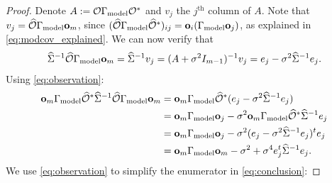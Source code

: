 \documentclass[ba]{imsart}
\newcommand{\obs}{\mathcal{O}}
\newcommand{\obsm}{\widehat{\obs}}
\newcommand{\Sigmam}{\widehat{\Sigma}}
\newcommand{\meas}{\mathbf{o}}
\theoremstyle{plain}
\theoremstyle{definition}
\theoremstyle{remark}
\providecommand{\DIFaddbegin}{} %
\providecommand{\DIFaddend}{} %
\providecommand{\DIFdelbegin}{} %
\providecommand{\DIFdelend}{} %
\newcommand{\DIFscaledelfig}{0.5}
\newlength{\DIFdelgraphicswidth} %
\newlength{\DIFdelgraphicsheight} %
\newcommand{\DIFaddincludegraphics}[2][]{{\color{blue}\fbox{\DIFOincludegraphics[#1]{#2}}}} %
\newcommand{\DIFdelincludegraphics}[2][]{%
\sbox{\DIFdelgraphicsbox}{\DIFOincludegraphics[#1]{#2}}%
\settoboxwidth{\DIFdelgraphicswidth}{\DIFdelgraphicsbox} %
\settoboxtotalheight{\DIFdelgraphicsheight}{\DIFdelgraphicsbox} %
\scalebox{\DIFscaledelfig}{%
\parbox[b]{\DIFdelgraphicswidth}{\usebox{\DIFdelgraphicsbox}\\[-\baselineskip] \rule{\DIFdelgraphicswidth}{0em}}\llap{\resizebox{\DIFdelgraphicswidth}{\DIFdelgraphicsheight}{%
\setlength{\unitlength}{\DIFdelgraphicswidth}%
\begin{picture}(1,1)%
\thicklines\linethickness{2pt} %
{\color[rgb]{1,0,0}\put(0,0){\framebox(1,1){}}}%
{\color[rgb]{1,0,0}\put(0,0){\line( 1,1){1}}}%
{\color[rgb]{1,0,0}\put(0,1){\line(1,-1){1}}}%
\end{picture}%
}\hspace*{3pt}}} %
} %
\DeclareRobustCommand{\DIFaddbegin}{\DIFOaddbegin \let\includegraphics\DIFaddincludegraphics} %
\DeclareRobustCommand{\DIFaddend}{\DIFOaddend \let\includegraphics\DIFOincludegraphics} %
\DeclareRobustCommand{\DIFdelbegin}{\DIFOdelbegin \let\includegraphics\DIFdelincludegraphics} %
\DeclareRobustCommand{\DIFdelend}{\DIFOaddend \let\includegraphics\DIFOincludegraphics} %
\begin{document}
\begin{proof} \label{cor:same_meas_proof}
  Denote $A:= \obs \modcov \obs^*$ and $v_j$ the $j^{\text{th}}$
  column of $A$.  Note that $v_j = \obsm \modcov \meas_m$, since
  $(\obsm \modcov \obsm^*)_{ij} = \meas_i(\modcov \meas_j)$, as
  explained in \eqref{eq:modcov_explained}. We can now verify that
  \begin{equation}\label{eq:observation}
    \Sigmam^{-1} \obsm \modcov \meas_m = \Sigmam^{-1}v_j = (A +\sigma^2I_{m-1})^{-1} v_j =
    e_j -\sigma^2 \Sigmam^{-1}e_j.
  \end{equation}
  Using \eqref{eq:observation}:
  \DIFdelbegin %
\DIFdelend \DIFaddbegin \begin{align}\label{eq:denominator}
    \begin{split}
      \meas_m \modcov \obsm^* \Sigmam^{-1} \obsm \modcov \meas_m
      &= \meas_m \modcov \obsm^* ( e_j - \sigma^2 \Sigmam^{-1} e_j )\\
&= \meas_m \modcov \meas_j - \sigma^2 \meas_m \modcov \obsm^* \Sigmam^{-1}e_j \\
&= \meas_m \modcov \meas_j -\sigma^2 (e_j - \sigma^2 \Sigmam^{-1}e_j)^t e_j \\
&= \meas_m \modcov \meas_m -\sigma^2 + \sigma^4 e_j^t\Sigmam^{-1}e_j.
    \end{split}
  \end{align}\DIFaddend 
  We use \eqref{eq:observation} to simplify the enumerator in
  \eqref{eq:conclusion}:
  \DIFdelbegin %

\end{proof}
\end{document}
